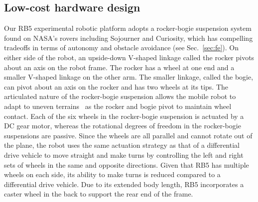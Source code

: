 \documentclass[letterpaper,10pt,conference,twoside]{IEEEtran}
\theoremstyle{definition}
\begin{document}
\subsection{Low-cost %
hardware design}
\label{sec:md}
\noindent
Our RB5 experimental robotic platform %
adopts a rocker-bogie suspension system~\cite{bickler1989articulated} found on NASA's rovers including Sojourner and Curiosity, which has compelling tradeoffs in terms of autonomy and obstacle avoidance (see Sec.~\ref{sec:fe}). On either side of the robot, an upside-down V-shaped linkage called the rocker pivots about an axis on the robot frame. The rocker has a wheel at one end and a smaller V-shaped linkage on the other arm. The smaller linkage, called the bogie, can pivot about an axis on the rocker and has two wheels at its tips. The articulated nature of the rocker-bogie suspension allows the mobile robot to adapt to uneven terrains~\cite{%
faisal2021low} as the rocker and bogie pivot to maintain wheel contact. %
%
Each of the six wheels in the rocker-bogie suspension is actuated by a DC gear motor, whereas the rotational degrees of freedom in the rocker-bogie suspensions are passive. Since the wheels are all parallel and cannot rotate out of the plane, the robot uses the same actuation strategy as that of a differential drive vehicle to move straight and make turns by controlling the left and right sets of wheels in the same and opposite directions. Given that RB5 has multiple wheels on each side, its ability to make turns is reduced compared to a differential drive vehicle. Due to its extended body length, RB5 incorporates a caster wheel in the back to support the rear end of the frame.
\end{document}
